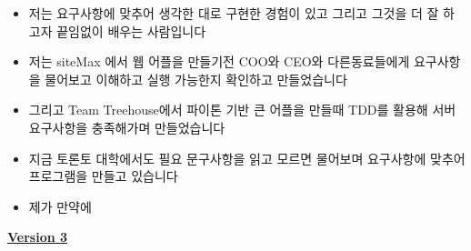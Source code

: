 \documentclass[12pt]{article}
\begin{document}
\begin{itemize}
\begin{itemize}
        \begin{itemize}
            \item 저는 요구사항에 맞추어 생각한 대로 구현한 경험이 있고 그리고 그것을 더 잘 하고자 끝임없이 배우는 사람입니다
            \item 저는 siteMax 에서 웹 어플을 만들기전 COO와 CEO와 다른동료들에게 요구사항을 물어보고 이해하고 실행 가능한지 확인하고 만들었습니다
            \item 그리고 Team Treehouse에서 파이톤 기반 큰 어플을 만들때 TDD를 활용해 서버 요구사항을 충족해가며 만들었습니다
            \item 지금 토론토 대학에서도 필요 문구사항을 읽고 모르면 물어보며 요구사항에 맞추어 프로그램을 만들고 있습니다
            \item 제가 만약에
        \end{itemize}

        \bigskip

        \underline{\textbf{Version 3}}

        \bigskip


\end{itemize}
\end{itemize}
\end{document}
